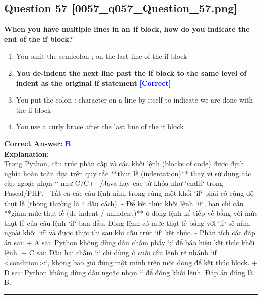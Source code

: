 \documentclass[11pt,a4paper]{article}
\begin{document}
\begin{minipage}{\textwidth}
\subsection*{Question 57 \quad \footnotesize{[0057_q057_Question_57.png]}}
\noindent \textbf{When you have multiple lines in an if block, how do you indicate the end of the if block?}

\begin{enumerate}[label=\Alph*.]
    \item You omit the semicolon ; on the last line of the if block
    \item \textbf{You de-indent the next line past the if block to the same level of indent as the original if statement} \hfill \textcolor{blue}{\textbf{[Correct]}}
    \item You put the colon : character on a line by itself to indicate we are done with the if block
    \item You use a curly brace  after the last line of the if block
\end{enumerate}

\noindent \textbf{Correct Answer:} \textcolor{blue}{\textbf{B}} \\[4pt]
\noindent \textbf{Explanation:}\\
Trong Python, cấu trúc phân cấp và các khối lệnh (blocks of code) được định nghĩa hoàn toàn dựa trên quy tắc **thụt lề (indentation)** thay vì sử dụng các cặp ngoặc nhọn `{}` như C/C++/Java hay các từ khóa như `endif` trong Pascal/PHP.\newline
- Tất cả các câu lệnh nằm trong cùng một khối `if` phải có cùng độ thụt lề (thông thường là 4 dấu cách).\newline
- Để kết thúc khối lệnh `if`, bạn chỉ cần **giảm mức thụt lề (de-indent / unindent)** ở dòng lệnh kế tiếp về bằng với mức thụt lề của câu lệnh `if` ban đầu. Dòng lệnh có mức thụt lề bằng với `if` sẽ nằm ngoài khối `if` và được thực thi sau khi cấu trúc `if` kết thúc.\newline
- Phân tích các đáp án sai:\newline
  + A sai: Python không dùng dấu chấm phẩy `;` để báo hiệu kết thúc khối lệnh.\newline
  + C sai: Dấu hai chấm `:` chỉ dùng ở cuối câu lệnh rẽ nhánh `if <condition>:`, không bao giờ đứng một mình trên một dòng để kết thúc block.\newline
  + D sai: Python không dùng dấu ngoặc nhọn `{}` để đóng khối lệnh.\newline
Đáp án đúng là B.
\end{minipage}
\vspace{0.8cm}
\hrule
\vspace{0.5cm}
\end{document}
